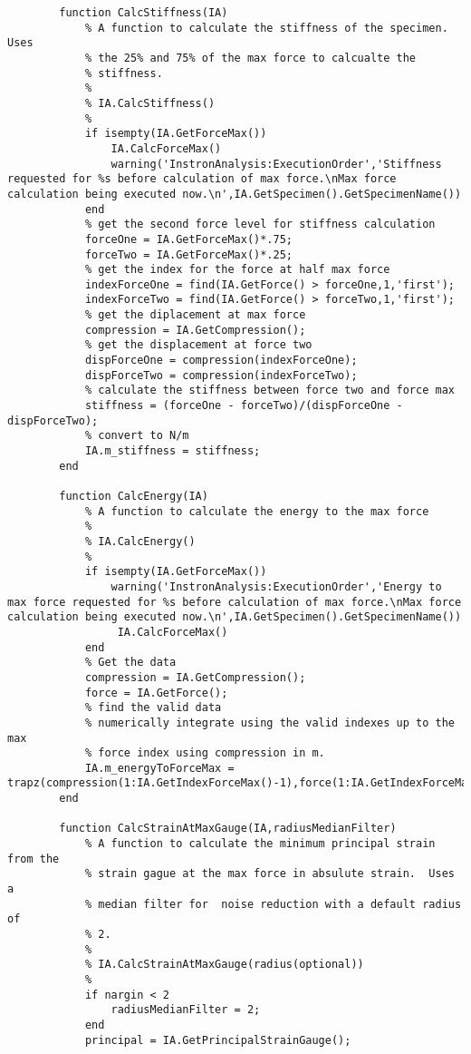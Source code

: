 \begin{lstlisting}
        function CalcStiffness(IA)
            % A function to calculate the stiffness of the specimen. Uses
            % the 25% and 75% of the max force to calcualte the
            % stiffness.
            %
            % IA.CalcStiffness()
            %
            if isempty(IA.GetForceMax())
                IA.CalcForceMax()
                warning('InstronAnalysis:ExecutionOrder','Stiffness requested for %s before calculation of max force.\nMax force calculation being executed now.\n',IA.GetSpecimen().GetSpecimenName())
            end 
            % get the second force level for stiffness calculation
            forceOne = IA.GetForceMax()*.75;
            forceTwo = IA.GetForceMax()*.25;
            % get the index for the force at half max force
            indexForceOne = find(IA.GetForce() > forceOne,1,'first');
            indexForceTwo = find(IA.GetForce() > forceTwo,1,'first');
            % get the diplacement at max force
            compression = IA.GetCompression();
            % get the displacement at force two
            dispForceOne = compression(indexForceOne);
            dispForceTwo = compression(indexForceTwo);
            % calculate the stiffness between force two and force max
            stiffness = (forceOne - forceTwo)/(dispForceOne - dispForceTwo);
            % convert to N/m
            IA.m_stiffness = stiffness;
        end

        function CalcEnergy(IA)
            % A function to calculate the energy to the max force
            %
            % IA.CalcEnergy()
            %
            if isempty(IA.GetForceMax())
                warning('InstronAnalysis:ExecutionOrder','Energy to max force requested for %s before calculation of max force.\nMax force calculation being executed now.\n',IA.GetSpecimen().GetSpecimenName())
                 IA.CalcForceMax()           
            end
            % Get the data
            compression = IA.GetCompression();
            force = IA.GetForce();
            % find the valid data
            % numerically integrate using the valid indexes up to the max
            % force index using compression in m.
            IA.m_energyToForceMax = trapz(compression(1:IA.GetIndexForceMax()-1),force(1:IA.GetIndexForceMax()-1));
        end

        function CalcStrainAtMaxGauge(IA,radiusMedianFilter)
            % A function to calculate the minimum principal strain from the
            % strain gague at the max force in absulute strain.  Uses a 
            % median filter for  noise reduction with a default radius of
            % 2.
            %
            % IA.CalcStrainAtMaxGauge(radius(optional))
            %
            if nargin < 2
                radiusMedianFilter = 2;
            end
            principal = IA.GetPrincipalStrainGauge();
            

\end{lstlisting}
